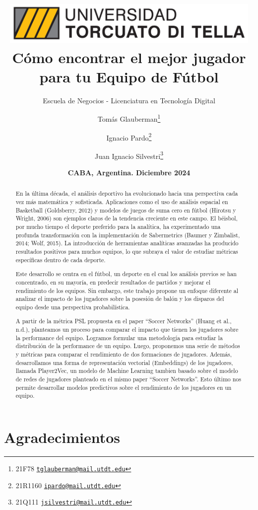 \documentclass[
  a4paper,
]{article}
\title{\includegraphics[width=5in,height=\textheight]{recursos_pdf/utdt.jpg}\\
Cómo encontrar el mejor jugador para tu Equipo de Fútbol}
\subtitle{Escuela de Negocios - Licenciatura en Tecnología Digital}
\author{Tomás Glauberman\footnote{21F78 \textbar{}
  \href{mailto:tglauberman@mail.utdt.edu}{\nolinkurl{tglauberman@mail.utdt.edu}}} \and Ignacio
Pardo\footnote{21R1160 \textbar{}
  \href{mailto:ipardo@mail.utdt.edu}{\nolinkurl{ipardo@mail.utdt.edu}}} \and Juan
Ignacio Silvestri\footnote{21Q111 \textbar{}
  \href{mailto:jsilvestri@mail.utdt.edu}{\nolinkurl{jsilvestri@mail.utdt.edu}}}}
\date{\textbf{CABA, Argentina. Diciembre 2024}}
\begin{document}
\maketitle
\begin{abstract}
En la última década, el análisis deportivo ha evolucionado hacia una
perspectiva cada vez más matemática y sofisticada. Aplicaciones como el
uso de análisis espacial en Basketball (Goldsberry, 2012) y modelos de
juegos de suma cero en fútbol (Hirotsu y Wright, 2006) son ejemplos
claros de la tendencia creciente en este campo. El béisbol, por mucho
tiempo el deporte preferido para la analítica, ha experimentado una
profunda transformación con la implementación de Sabermetrics (Baumer y
Zimbalist, 2014; Wolf, 2015). La introducción de herramientas analíticas
avanzadas ha producido resultados positivos para muchos equipos, lo que
subraya el valor de estudiar métricas específicas dentro de cada
deporte.

Este desarrollo se centra en el fútbol, un deporte en el cual los
análisis previos se han concentrado, en su mayoría, en predecir
resultados de partidos y mejorar el rendimiento de los equipos. Sin
embargo, este trabajo propone un enfoque diferente al analizar el
impacto de los jugadores sobre la posesión de balón y los disparos del
equipo desde una perspectiva probabilística.

A partir de la métrica PSL propuesta en el paper ``Soccer Networks''
(Huang et al., n.d.), planteamos un proceso para comparar el impacto que
tienen los jugadores sobre la performance del equipo. Logramos formular
una metodología para estudiar la distribución de la performance de un
equipo. Luego, proponemos una serie de métodos y métricas para comparar
el rendimiento de dos formaciones de jugadores. Además, desarrollamos
una forma de representación vectorial (Embeddings) de los jugadores,
llamada Player2Vec, un modelo de Machine Learning tambien basado sobre
el modelo de redes de jugadores planteado en el mismo paper ``Soccer
Networks''. Esto último nos permite desarrollar modelos predictivos
sobre el rendimiento de los jugadores en un equipo. \newpage
\end{abstract}

{
\setcounter{tocdepth}{3}
\tableofcontents
}
\tableofcontents

\newpage

\hypertarget{agradecimientos}{%
\section{\texorpdfstring{\textbf{Agradecimientos}}{Agradecimientos}}\label{agradecimientos}}
\end{document}
